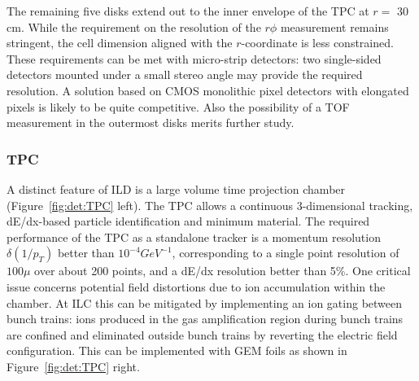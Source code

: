 The remaining five disks extend out to the inner envelope of the TPC at $r=$ 30 cm. While the requirement on the resolution of the $r\phi$ measurement remains stringent, the cell dimension aligned with the $r$-coordinate is less constrained. These requirements can be met with micro-strip detectors: two single-sided detectors mounted under a small stereo angle may provide the required resolution. A solution based on CMOS monolithic pixel detectors with elongated pixels is likely to be quite competitive. Also the possibility of a TOF measurement in the outermost disks merits further study.

\vspace{1cm}
\subsubsection*{\bf TPC}

A distinct feature of ILD is a large volume time projection chamber (Figure~\ref{fig:det:TPC} left). The TPC allows a continuous 3-dimensional tracking, dE/dx-based particle identification and minimum material. The required performance of the TPC as a standalone tracker is a momentum resolution $\delta(1/p_T)$ better than $10^{-4} GeV^{-1}$, corresponding to a single point resolution of $100\mu$ over about 200 points, and a dE/dx resolution better than 5\%. One critical issue concerns potential field distortions due to ion accumulation within the chamber. At ILC this can be mitigated by implementing an ion gating between bunch trains: ions produced in the gas amplification region during bunch trains are confined and eliminated outside bunch trains by reverting the electric field configuration. This can be implemented with GEM foils as shown in Figure~\ref{fig:det:TPC} right.

